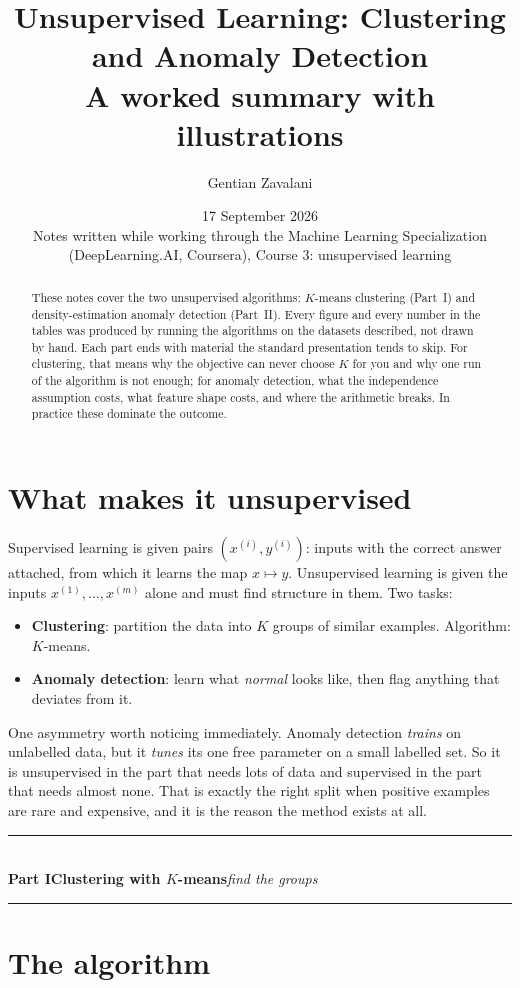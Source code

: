 \documentclass[11pt,a4paper]{article}
\title{\vspace{-1.2cm}\textbf{Unsupervised Learning: Clustering and Anomaly Detection}\\[2pt]
\large A worked summary with illustrations}
\author{Gentian Zavalani}
\date{\small 17 September 2026\\[4pt]
\footnotesize Notes written while working through the Machine Learning
Specialization\\
\footnotesize (DeepLearning.AI, Coursera), Course 3: unsupervised learning}
\newcommand{\partline}[2]{%
  \bigskip\par\noindent\rule{\textwidth}{0.9pt}\\[3pt]
  {\large\bfseries #1}\hfill{\itshape\small #2}\\[1pt]
  \noindent\rule{\textwidth}{0.35pt}\par\medskip}
\begin{document}
\maketitle
\vspace{-0.7cm}

\begin{abstract}\noindent\small
These notes cover the two unsupervised algorithms: $K$-means clustering
(Part~I) and density-estimation anomaly detection (Part~II). Every figure and
every number in the tables was produced by running the algorithms on the
datasets described, not drawn by hand. Each part ends with material the
standard presentation tends to skip. For clustering, that means why the
objective can never choose $K$ for you and why one run of the algorithm is not
enough; for anomaly detection, what the independence assumption costs, what
feature shape costs, and where the arithmetic breaks. In practice these
dominate the outcome.
\end{abstract}

\section{What makes it unsupervised}

Supervised learning is given pairs $(x^{(i)},y^{(i)})$: inputs with the
correct answer attached, from which it learns the map $x \mapsto y$.
Unsupervised learning is given the inputs $x^{(1)},\dots,x^{(m)}$ alone and
must find structure in them. Two tasks:

\begin{itemize}
\item \textbf{Clustering}: partition the data into $K$ groups of similar
      examples. Algorithm: $K$-means.
\item \textbf{Anomaly detection}: learn what \emph{normal} looks like, then
      flag anything that deviates from it.
\end{itemize}

One asymmetry worth noticing immediately. Anomaly detection \emph{trains} on
unlabelled data, but it \emph{tunes} its one free parameter on a small
labelled set. So it is unsupervised in the part that needs lots of data and
supervised in the part that needs almost none. That is exactly the right
split when positive examples are rare and expensive, and it is the reason the
method exists at all.

\partline{Part I\quad Clustering with $K$-means}{find the groups}

\section{The algorithm}
\end{document}
